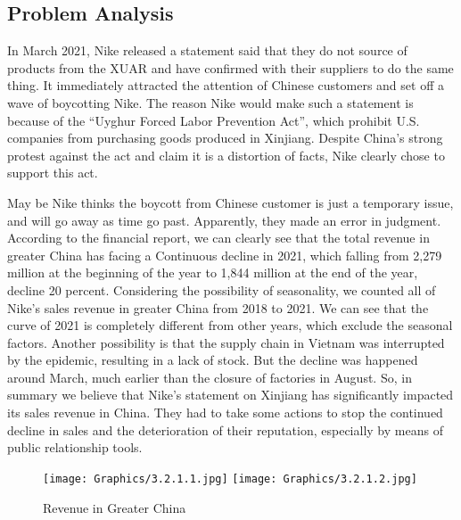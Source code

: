 \documentclass[a4paper, 12pt]{report}
\begin{document}
\subsection{Problem Analysis}
In March 2021, Nike released a statement said that they do not source of products from the XUAR and have confirmed with their suppliers to do the same thing. It immediately attracted the attention of Chinese customers and set off a wave of boycotting Nike. The reason Nike would make such a statement is because of the “Uyghur Forced Labor Prevention Act”, which prohibit U.S. companies from purchasing goods produced in Xinjiang. Despite China's strong protest against the act and claim it is a distortion of facts, Nike clearly chose to support this act.  \par
May be Nike thinks the boycott from Chinese customer is just a temporary issue, and will go away as time go past. Apparently, they made an error in judgment. According to the financial report, we can clearly see that the total revenue in greater China has facing a Continuous decline in 2021, which falling from 2,279 million at the beginning of the year to 1,844 million at the end of the year, decline 20 percent. Considering the possibility of seasonality, we counted all of Nike's sales revenue in greater China from 2018 to 2021. We can see that the curve of 2021 is completely different from other years, which exclude the seasonal factors. Another possibility is that the supply chain in Vietnam was interrupted by the epidemic, resulting in a lack of stock. But the decline was happened around March, much earlier than the closure of factories in August. So, in summary we believe that Nike's statement on Xinjiang has significantly impacted its sales revenue in China. They had to take some actions to stop the continued decline in sales and the deterioration of their reputation, especially by means of public relationship tools.\par
 \begin{figure}[!htbp]
     \centering
     \texttt{[image: Graphics/3.2.1.1.jpg]}
     \qquad
     \texttt{[image: Graphics/3.2.1.2.jpg]}
     \caption{\label{3.2.1}Revenue in Greater China}
 \end{figure}
\end{document}
